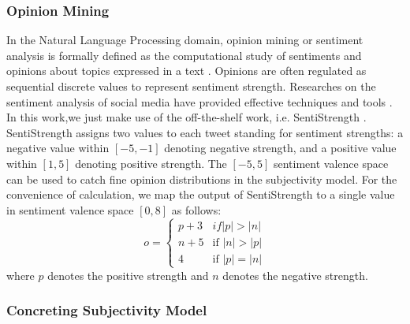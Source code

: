 \documentclass{acm_proc_article-sp}
\begin{document}
\subsubsection{Opinion Mining}
\label{opinion}

In the Natural Language Processing domain, opinion mining or sentiment analysis is formally defined as the computational study of sentiments and opinions about topics expressed in a text \cite{liu2012sentiment}. Opinions are often regulated as sequential discrete values to represent sentiment strength. Researches on the sentiment analysis of social media have provided effective techniques and tools \cite{thelwall2010sentiment,hu2013unsupervised}. In this work,we just make use of the off-the-shelf work, i.e. SentiStrength \cite{thelwall2010sentiment}. 
SentiStrength assigns two values to each tweet standing for sentiment strengths: a negative value within $ \left[ -5,-1 \right]  $ denoting negative strength, and a positive value within $ \left[ 1,5 \right]  $ denoting  positive strength. The $ \left[ -5,5 \right] $ sentiment valence space can be used to catch fine opinion distributions in the subjectivity model. 
For the convenience of calculation, we map the output of SentiStrength to a single value in sentiment valence space $ \left[ 0, 8 \right] $ as follows:
\begin{equation}
\label{opinionmap}
o= \left\{ 
\begin{array}{lll}
{p+3} & if \vert p \vert > \vert n \vert \\
{n+5} & \text{if } \vert n \vert > \vert p \vert \\
{4}  & \text{if } \vert p \vert = \vert n \vert
\end{array}
\right.
\end{equation}
where $ p $ denotes the positive strength and $ n $ denotes the negative strength. 

\subsubsection{Concreting Subjectivity Model}
\label{concrete}
 
\end{document}
